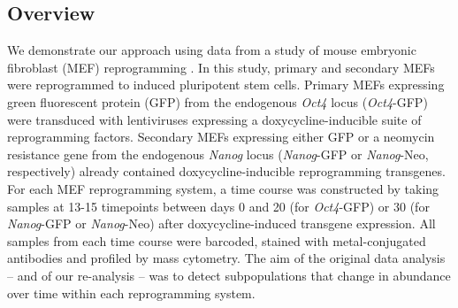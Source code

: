 \documentclass{article}
\begin{document}
\subsection{Overview}
We demonstrate our approach using data from a study of mouse embryonic fibroblast (MEF) reprogramming \cite{zunder2015continuous}.
In this study, primary and secondary MEFs were reprogrammed to induced pluripotent stem cells.
Primary MEFs expressing green fluorescent protein (GFP) from the endogenous \textit{Oct4} locus (\textit{Oct4}-GFP) were transduced with lentiviruses expressing a doxycycline-inducible suite of reprogramming factors.
Secondary MEFs expressing either GFP or a neomycin resistance gene from the endogenous \textit{Nanog} locus (\textit{Nanog}-GFP or \textit{Nanog}-Neo, respectively) already contained doxycycline-inducible reprogramming transgenes.
For each MEF reprogramming system, a time course was constructed by taking samples at 13-15 timepoints between days 0 and 20 (for \textit{Oct4}-GFP) or 30 (for \textit{Nanog}-GFP or \textit{Nanog}-Neo) after doxycycline-induced transgene expression.
All samples from each time course were barcoded, stained with metal-conjugated antibodies and profiled by mass cytometry.
The aim of the original data analysis -- and of our re-analysis -- was to detect subpopulations that change in abundance over time within each reprogramming system.

\newcommand{\hi}{\textsuperscript{high}}
\newcommand{\lo}{\textsuperscript{low}}
\end{document}

